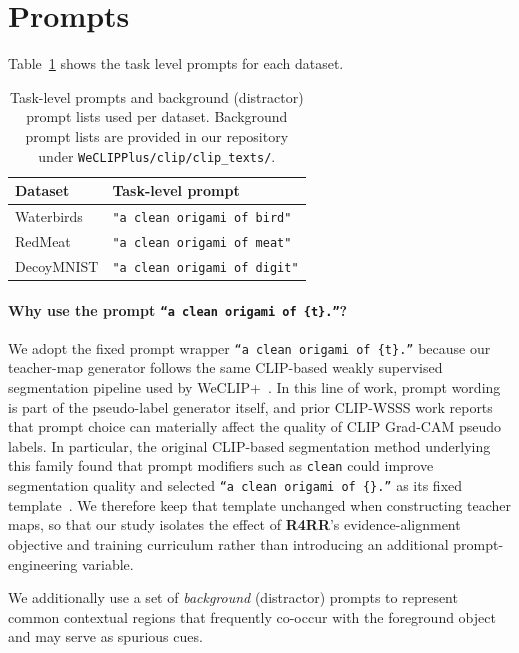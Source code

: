 \documentclass[10pt,twocolumn,letterpaper]{article}
\begin{document}
\section{Prompts}\label{appendix:prompts}

Table~\ref{tab:task_level_prompts} shows the task level prompts for each dataset. 

\begin{table}[h]
\centering
\caption{Task-level prompts and background (distractor) prompt lists used per dataset. Background prompt lists are provided in our repository under \texttt{WeCLIPPlus/clip/clip\_texts/}.}
\label{tab:task_level_prompts}
\small
\setlength{\tabcolsep}{6pt}
\renewcommand{\arraystretch}{1.05}
\begin{tabular}{ll}
\toprule
\textbf{Dataset} & \textbf{Task-level prompt} \\
\midrule
Waterbirds & \texttt{"a clean origami of bird"} \\
RedMeat    & \texttt{"a clean origami of meat"} \\
DecoyMNIST & \texttt{"a clean origami of digit"} \\
\bottomrule
\end{tabular}
\end{table}



\paragraph{Why use the prompt \texttt{``a clean origami of \{t\}.''}?}
We adopt the fixed prompt wrapper \texttt{``a clean origami of \{t\}.''} because our teacher-map generator follows the same CLIP-based weakly supervised segmentation pipeline used by WeCLIP+~\cite{zhang2024frozen}. In this line of work, prompt wording is part of the pseudo-label generator itself, and prior CLIP-WSSS work reports that prompt choice can materially affect the quality of CLIP Grad-CAM pseudo labels. In particular, the original CLIP-based segmentation method underlying this family found that prompt modifiers such as \texttt{clean} could improve segmentation quality and selected \texttt{``a clean origami of \{\}.''} as its fixed template~\cite{lin2023clip}. We therefore keep that template unchanged when constructing teacher maps, so that our study isolates the effect of \textbf{R4RR}'s evidence-alignment objective and training curriculum rather than introducing an additional prompt-engineering variable.

We additionally use a set of \emph{background} (distractor) prompts to represent common contextual regions that frequently co-occur with the foreground object and may serve as spurious cues.
\end{document}

